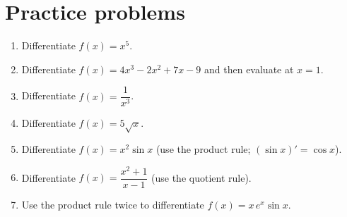 \section*{Practice problems}
\begin{enumerate}[label=\textbf{\thechapter.\arabic*}]
  \item Differentiate $f(x)=x^5$.
  \item Differentiate $f(x)=4x^3-2x^2+7x-9$ and then evaluate at $x=1$.
  \item Differentiate $f(x)=\dfrac{1}{x^3}$.
  \item Differentiate $f(x)=5\sqrt{x}$.
  \item Differentiate $f(x)=x^2\sin x$ (use the product rule; $(\sin x)'=\cos x$).
  \item Differentiate $f(x)=\dfrac{x^2+1}{x-1}$ (use the quotient rule).
  \item[\textbf{\thechapter.7}$\star$] Use the product rule twice to differentiate $f(x)=x\,e^x\sin x$.
\end{enumerate}

